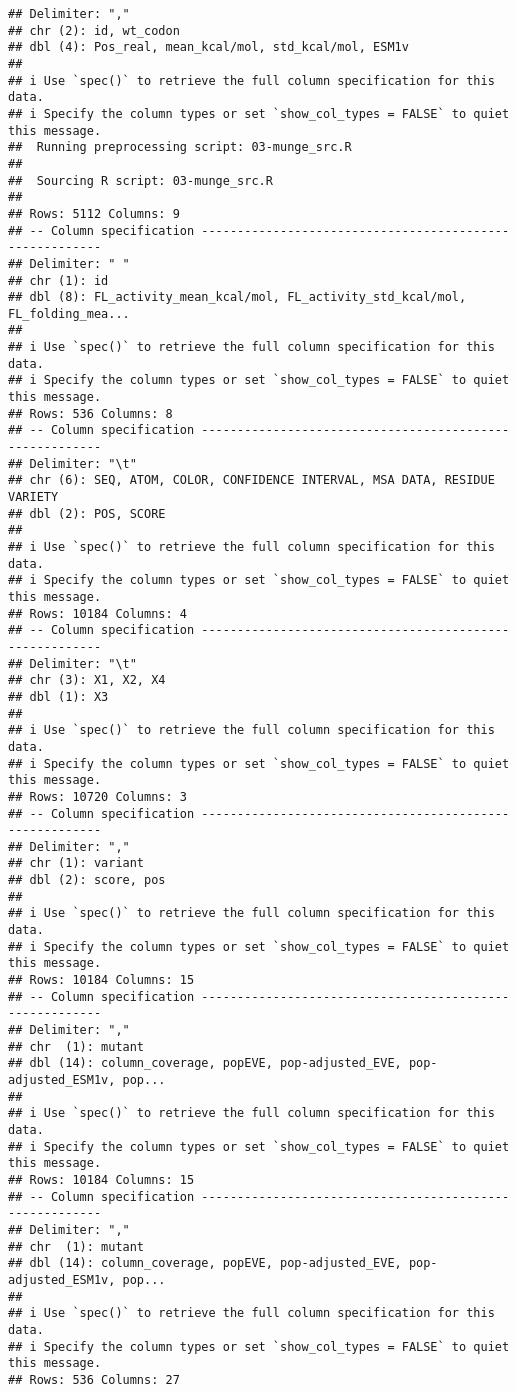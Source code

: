\documentclass[
]{article}
\begin{document}
\begin{verbatim}
## Delimiter: ","
## chr (2): id, wt_codon
## dbl (4): Pos_real, mean_kcal/mol, std_kcal/mol, ESM1v
## 
## i Use `spec()` to retrieve the full column specification for this data.
## i Specify the column types or set `show_col_types = FALSE` to quiet this message.
##  Running preprocessing script: 03-munge_src.R
## 
##  Sourcing R script: 03-munge_src.R
## 
## Rows: 5112 Columns: 9
## -- Column specification --------------------------------------------------------
## Delimiter: " "
## chr (1): id
## dbl (8): FL_activity_mean_kcal/mol, FL_activity_std_kcal/mol, FL_folding_mea...
## 
## i Use `spec()` to retrieve the full column specification for this data.
## i Specify the column types or set `show_col_types = FALSE` to quiet this message.
## Rows: 536 Columns: 8
## -- Column specification --------------------------------------------------------
## Delimiter: "\t"
## chr (6): SEQ, ATOM, COLOR, CONFIDENCE INTERVAL, MSA DATA, RESIDUE VARIETY
## dbl (2): POS, SCORE
## 
## i Use `spec()` to retrieve the full column specification for this data.
## i Specify the column types or set `show_col_types = FALSE` to quiet this message.
## Rows: 10184 Columns: 4
## -- Column specification --------------------------------------------------------
## Delimiter: "\t"
## chr (3): X1, X2, X4
## dbl (1): X3
## 
## i Use `spec()` to retrieve the full column specification for this data.
## i Specify the column types or set `show_col_types = FALSE` to quiet this message.
## Rows: 10720 Columns: 3
## -- Column specification --------------------------------------------------------
## Delimiter: ","
## chr (1): variant
## dbl (2): score, pos
## 
## i Use `spec()` to retrieve the full column specification for this data.
## i Specify the column types or set `show_col_types = FALSE` to quiet this message.
## Rows: 10184 Columns: 15
## -- Column specification --------------------------------------------------------
## Delimiter: ","
## chr  (1): mutant
## dbl (14): column_coverage, popEVE, pop-adjusted_EVE, pop-adjusted_ESM1v, pop...
## 
## i Use `spec()` to retrieve the full column specification for this data.
## i Specify the column types or set `show_col_types = FALSE` to quiet this message.
## Rows: 10184 Columns: 15
## -- Column specification --------------------------------------------------------
## Delimiter: ","
## chr  (1): mutant
## dbl (14): column_coverage, popEVE, pop-adjusted_EVE, pop-adjusted_ESM1v, pop...
## 
## i Use `spec()` to retrieve the full column specification for this data.
## i Specify the column types or set `show_col_types = FALSE` to quiet this message.
## Rows: 536 Columns: 27

\end{verbatim}
\end{document}
